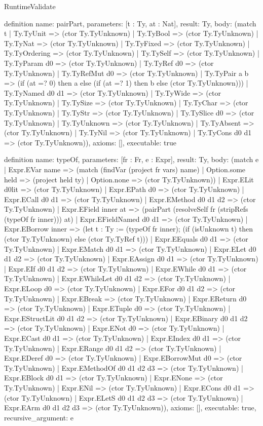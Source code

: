 \begin{lexlean}{RuntimeValidate}
\begin{semanticmodule}
definition{
  name: pairPart,
  parameters: [t : Ty, at : Nat],
  result: Ty,
  body: (match t
    | Ty.TyUnit => (ctor Ty.TyUnknown)
    | Ty.TyBool => (ctor Ty.TyUnknown)
    | Ty.TyNat => (ctor Ty.TyUnknown)
    | Ty.TyFixed => (ctor Ty.TyUnknown)
    | Ty.TyOrdering => (ctor Ty.TyUnknown)
    | Ty.TySelf => (ctor Ty.TyUnknown)
    | Ty.TyParam d0 => (ctor Ty.TyUnknown)
    | Ty.TyRef d0 => (ctor Ty.TyUnknown)
    | Ty.TyRefMut d0 => (ctor Ty.TyUnknown)
    | Ty.TyPair a b => (if (at =? 0) then a else (if (at =? 1) then b else (ctor Ty.TyUnknown)))
    | Ty.TyNamed d0 d1 => (ctor Ty.TyUnknown)
    | Ty.TyWide => (ctor Ty.TyUnknown)
    | Ty.TySize => (ctor Ty.TyUnknown)
    | Ty.TyChar => (ctor Ty.TyUnknown)
    | Ty.TyStr => (ctor Ty.TyUnknown)
    | Ty.TySlice d0 => (ctor Ty.TyUnknown)
    | Ty.TyUnknown => (ctor Ty.TyUnknown)
    | Ty.TyAbsent => (ctor Ty.TyUnknown)
    | Ty.TyNil => (ctor Ty.TyUnknown)
    | Ty.TyCons d0 d1 => (ctor Ty.TyUnknown)),
  axioms: [],
  executable: true
}

definition{
  name: typeOf,
  parameters: [fr : Fr, e : Expr],
  result: Ty,
  body: (match e
    | Expr.EVar name => (match (findVar (project fr vars) name)
      | Option.some held => (project held ty)
      | Option.none => (ctor Ty.TyUnknown))
    | Expr.ELit d0lit => (ctor Ty.TyUnknown)
    | Expr.EPath d0 => (ctor Ty.TyUnknown)
    | Expr.ECall d0 d1 => (ctor Ty.TyUnknown)
    | Expr.EMethod d0 d1 d2 => (ctor Ty.TyUnknown)
    | Expr.EField inner at => (pairPart (resolveSelf fr (stripRefs (typeOf fr inner))) at)
    | Expr.EFieldNamed d0 d1 => (ctor Ty.TyUnknown)
    | Expr.EBorrow inner => (let t : Ty := (typeOf fr inner); (if (isUnknown t) then (ctor Ty.TyUnknown) else (ctor Ty.TyRef t)))
    | Expr.EEquals d0 d1 => (ctor Ty.TyUnknown)
    | Expr.EMatch d0 d1 => (ctor Ty.TyUnknown)
    | Expr.ELet d0 d1 d2 => (ctor Ty.TyUnknown)
    | Expr.EAssign d0 d1 => (ctor Ty.TyUnknown)
    | Expr.EIf d0 d1 d2 => (ctor Ty.TyUnknown)
    | Expr.EWhile d0 d1 => (ctor Ty.TyUnknown)
    | Expr.EWhileLet d0 d1 d2 => (ctor Ty.TyUnknown)
    | Expr.ELoop d0 => (ctor Ty.TyUnknown)
    | Expr.EFor d0 d1 d2 => (ctor Ty.TyUnknown)
    | Expr.EBreak => (ctor Ty.TyUnknown)
    | Expr.EReturn d0 => (ctor Ty.TyUnknown)
    | Expr.ETuple d0 => (ctor Ty.TyUnknown)
    | Expr.EStructLit d0 d1 d2 => (ctor Ty.TyUnknown)
    | Expr.EBinary d0 d1 d2 => (ctor Ty.TyUnknown)
    | Expr.ENot d0 => (ctor Ty.TyUnknown)
    | Expr.ECast d0 d1 => (ctor Ty.TyUnknown)
    | Expr.EIndex d0 d1 => (ctor Ty.TyUnknown)
    | Expr.ERange d0 d1 d2 => (ctor Ty.TyUnknown)
    | Expr.EDeref d0 => (ctor Ty.TyUnknown)
    | Expr.EBorrowMut d0 => (ctor Ty.TyUnknown)
    | Expr.EMethodOf d0 d1 d2 d3 => (ctor Ty.TyUnknown)
    | Expr.EBlock d0 d1 => (ctor Ty.TyUnknown)
    | Expr.ENone => (ctor Ty.TyUnknown)
    | Expr.ENil => (ctor Ty.TyUnknown)
    | Expr.ECons d0 d1 => (ctor Ty.TyUnknown)
    | Expr.ELetS d0 d1 d2 d3 => (ctor Ty.TyUnknown)
    | Expr.EArm d0 d1 d2 d3 => (ctor Ty.TyUnknown)),
  axioms: [],
  executable: true,
  recursive_argument: e
}


\end{semanticmodule}
\end{lexlean}
